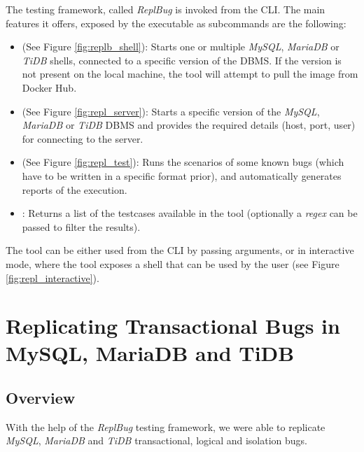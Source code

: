 The testing framework, called \textit{ReplBug} is invoked from the CLI. The main features it offers, exposed by the executable as subcommands are the following:
\begin{itemize}
    \item \textbf{} (See Figure \ref{fig:replb_shell}): Starts one or multiple \textit{MySQL}, \textit{MariaDB} or \textit{TiDB} shells, connected to a specific version of the DBMS. If the version is not present on the local machine, the tool will attempt to pull the image from Docker Hub.
    \item \textbf{} (See Figure \ref{fig:repl_server}): Starts a specific version of the \textit{MySQL}, \textit{MariaDB} or \textit{TiDB} DBMS and provides the required details (host, port, user) for connecting to the server.
    \item \textbf{} (See Figure \ref{fig:repl_test}): Runs the scenarios of some known bugs (which have to be written in a specific format prior), and automatically generates reports of the execution.
    \item \textbf{}: Returns a list of the testcases available in the tool (optionally a \textit{regex} can be passed to filter the results).
\end{itemize}

The tool can be either used from the CLI by passing arguments, or in interactive mode, where the tool exposes a shell that can be used by the user  (see Figure \ref{fig:repl_interactive}).

\chapter{Replicating Transactional Bugs in MySQL, MariaDB and TiDB}

\section{Overview}

With the help of the \textit{ReplBug} testing framework, we were able to replicate \textit{MySQL}, \textit{MariaDB} and \textit{TiDB} transactional, logical and isolation bugs.

